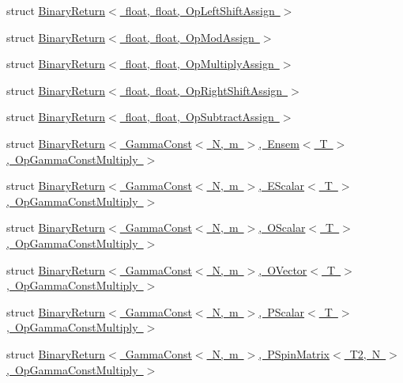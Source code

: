 \begin{DoxyCompactItemize}
\item 
struct \mbox{\hyperlink{structENSEM_1_1BinaryReturn_3_01float_00_01float_00_01OpLeftShiftAssign_01_4}{Binary\+Return$<$ float, float, Op\+Left\+Shift\+Assign $>$}}
\item 
struct \mbox{\hyperlink{structENSEM_1_1BinaryReturn_3_01float_00_01float_00_01OpModAssign_01_4}{Binary\+Return$<$ float, float, Op\+Mod\+Assign $>$}}
\item 
struct \mbox{\hyperlink{structENSEM_1_1BinaryReturn_3_01float_00_01float_00_01OpMultiplyAssign_01_4}{Binary\+Return$<$ float, float, Op\+Multiply\+Assign $>$}}
\item 
struct \mbox{\hyperlink{structENSEM_1_1BinaryReturn_3_01float_00_01float_00_01OpRightShiftAssign_01_4}{Binary\+Return$<$ float, float, Op\+Right\+Shift\+Assign $>$}}
\item 
struct \mbox{\hyperlink{structENSEM_1_1BinaryReturn_3_01float_00_01float_00_01OpSubtractAssign_01_4}{Binary\+Return$<$ float, float, Op\+Subtract\+Assign $>$}}
\item 
struct \mbox{\hyperlink{structENSEM_1_1BinaryReturn_3_01GammaConst_3_01N_00_01m_01_4_00_01Ensem_3_01T_01_4_00_01OpGammaConstMultiply_01_4}{Binary\+Return$<$ Gamma\+Const$<$ N, m $>$, Ensem$<$ T $>$, Op\+Gamma\+Const\+Multiply $>$}}
\item 
struct \mbox{\hyperlink{structENSEM_1_1BinaryReturn_3_01GammaConst_3_01N_00_01m_01_4_00_01EScalar_3_01T_01_4_00_01OpGammaConstMultiply_01_4}{Binary\+Return$<$ Gamma\+Const$<$ N, m $>$, E\+Scalar$<$ T $>$, Op\+Gamma\+Const\+Multiply $>$}}
\item 
struct \mbox{\hyperlink{structENSEM_1_1BinaryReturn_3_01GammaConst_3_01N_00_01m_01_4_00_01OScalar_3_01T_01_4_00_01OpGammaConstMultiply_01_4}{Binary\+Return$<$ Gamma\+Const$<$ N, m $>$, O\+Scalar$<$ T $>$, Op\+Gamma\+Const\+Multiply $>$}}
\item 
struct \mbox{\hyperlink{structENSEM_1_1BinaryReturn_3_01GammaConst_3_01N_00_01m_01_4_00_01OVector_3_01T_01_4_00_01OpGammaConstMultiply_01_4}{Binary\+Return$<$ Gamma\+Const$<$ N, m $>$, O\+Vector$<$ T $>$, Op\+Gamma\+Const\+Multiply $>$}}
\item 
struct \mbox{\hyperlink{structENSEM_1_1BinaryReturn_3_01GammaConst_3_01N_00_01m_01_4_00_01PScalar_3_01T_01_4_00_01OpGammaConstMultiply_01_4}{Binary\+Return$<$ Gamma\+Const$<$ N, m $>$, P\+Scalar$<$ T $>$, Op\+Gamma\+Const\+Multiply $>$}}
\item 
struct \mbox{\hyperlink{structENSEM_1_1BinaryReturn_3_01GammaConst_3_01N_00_01m_01_4_00_01PSpinMatrix_3_01T2_00_01N_01_4_00_01OpGammaConstMultiply_01_4}{Binary\+Return$<$ Gamma\+Const$<$ N, m $>$, P\+Spin\+Matrix$<$ T2, N $>$, Op\+Gamma\+Const\+Multiply $>$}}

\end{DoxyCompactItemize}
